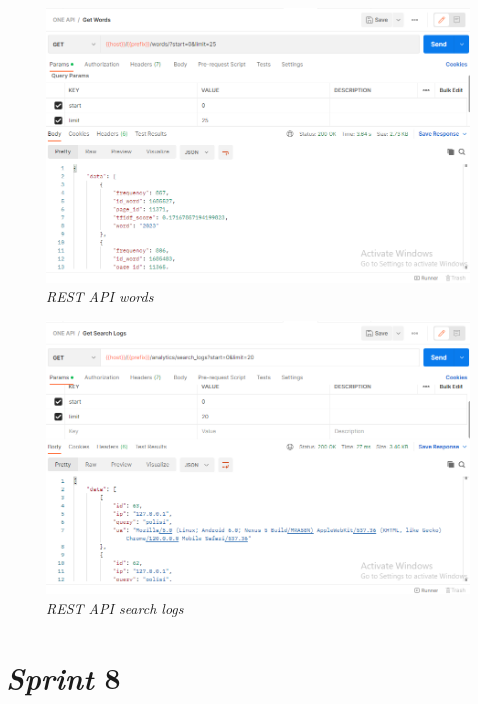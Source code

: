 \begin{enumerate}[label=\alph*)., leftmargin=1\parindent]
	
	\begin{figure}[H]
		\centering
		\includegraphics[keepaspectratio, width=13cm]{gambar/rest_words.png}
		\caption{\textit{REST API words}}
		\label{gambar:rest_words.png}
	\end{figure}
	
	\begin{figure}[H]
		\centering
		\includegraphics[keepaspectratio, width=13cm]{gambar/rest_search_logs.png}
		\caption{\textit{REST API search logs}}
		\label{gambar:rest_search_logs.png}
	\end{figure}

\end{enumerate}


\section{\textit{Sprint} 8}

